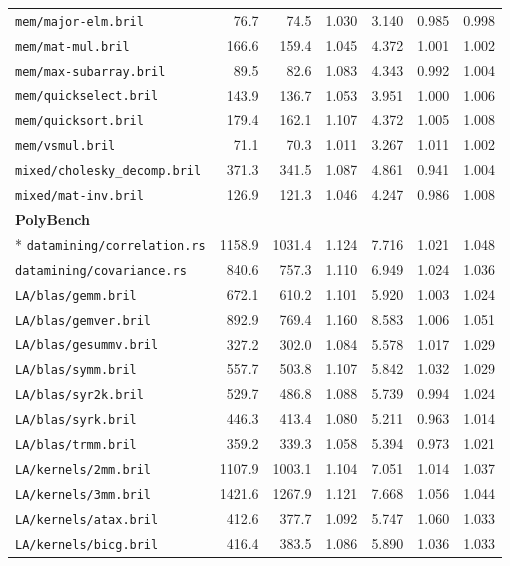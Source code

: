 \begin{longtable}{p{52mm}rrrrrr}
\nolinkurl{mem/major-elm.bril} & 76.7 & 74.5 & 1.030 & 3.140 & 0.985 & 0.998 \\
\nolinkurl{mem/mat-mul.bril} & 166.6 & 159.4 & 1.045 & 4.372 & 1.001 & 1.002 \\
\nolinkurl{mem/max-subarray.bril} & 89.5 & 82.6 & 1.083 & 4.343 & 0.992 & 1.004 \\
\nolinkurl{mem/quickselect.bril} & 143.9 & 136.7 & 1.053 & 3.951 & 1.000 & 1.006 \\
\nolinkurl{mem/quicksort.bril} & 179.4 & 162.1 & 1.107 & 4.372 & 1.005 & 1.008 \\
\nolinkurl{mem/vsmul.bril} & 71.1 & 70.3 & 1.011 & 3.267 & 1.011 & 1.002 \\
\nolinkurl{mixed/cholesky_decomp.bril} & 371.3 & 341.5 & 1.087 & 4.861 & 0.941 & 1.004 \\
\nolinkurl{mixed/mat-inv.bril} & 126.9 & 121.3 & 1.046 & 4.247 & 0.986 & 1.008 \\
\multicolumn{7}{l}{\textbf{PolyBench}}\\*
\nolinkurl{datamining/correlation.rs} & 1158.9 & 1031.4 & 1.124 & 7.716 & 1.021 & 1.048 \\
\nolinkurl{datamining/covariance.rs} & 840.6 & 757.3 & 1.110 & 6.949 & 1.024 & 1.036 \\
\nolinkurl{LA/blas/gemm.bril} & 672.1 & 610.2 & 1.101 & 5.920 & 1.003 & 1.024 \\
\nolinkurl{LA/blas/gemver.bril} & 892.9 & 769.4 & 1.160 & 8.583 & 1.006 & 1.051 \\
\nolinkurl{LA/blas/gesummv.bril} & 327.2 & 302.0 & 1.084 & 5.578 & 1.017 & 1.029 \\
\nolinkurl{LA/blas/symm.bril} & 557.7 & 503.8 & 1.107 & 5.842 & 1.032 & 1.029 \\
\nolinkurl{LA/blas/syr2k.bril} & 529.7 & 486.8 & 1.088 & 5.739 & 0.994 & 1.024 \\
\nolinkurl{LA/blas/syrk.bril} & 446.3 & 413.4 & 1.080 & 5.211 & 0.963 & 1.014 \\
\nolinkurl{LA/blas/trmm.bril} & 359.2 & 339.3 & 1.058 & 5.394 & 0.973 & 1.021 \\
\nolinkurl{LA/kernels/2mm.bril} & 1107.9 & 1003.1 & 1.104 & 7.051 & 1.014 & 1.037 \\
\nolinkurl{LA/kernels/3mm.bril} & 1421.6 & 1267.9 & 1.121 & 7.668 & 1.056 & 1.044 \\
\nolinkurl{LA/kernels/atax.bril} & 412.6 & 377.7 & 1.092 & 5.747 & 1.060 & 1.033 \\
\nolinkurl{LA/kernels/bicg.bril} & 416.4 & 383.5 & 1.086 & 5.890 & 1.036 & 1.033 \\

\end{longtable}
